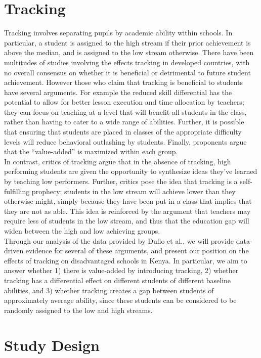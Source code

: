 \documentclass[11pt]{article}
\begin{document}
\section{Tracking}
Tracking involves separating pupils by academic ability within schools. In particular, a student is assigned to the high stream if their prior achievement is above the median, and is assigned to the low stream otherwise. There have been multitudes of studies involving the effects tracking in developed countries, with no overall consensus on whether it is beneficial or detrimental to future student achievement. However those who claim that tracking is beneficial to students have several arguments. For example the reduced skill differential has the potential to allow for better lesson execution and time allocation by teachers; they can focus on teaching at a level that will benefit all students in the class, rather than having to cater to a wide range of abilities. Further, it is possible that ensuring that students are placed in classes of the appropriate difficulty levels will reduce behavioral outlashing by students. Finally, proponents argue that the ``value-added'' is maximized within each group.\\

In contrast, critics of tracking argue that in the absence of tracking, high performing students are given the opportunity to synthesize ideas they've learned by teaching low performers. Further, critics pose the idea that tracking is a self-fulfilling prophecy; students in the low stream will achieve lower than they otherwise might, simply because they have been put in a class that implies that they are not as able. This idea is reinforced by the argument that teachers may require less of students in the low stream, and thus that the education gap will widen between the high and low achieving groups.\\

Through our analysis of the data provided by Duflo et al., we will provide data-driven evidence for several of these arguments, and present our position on the effects of tracking on disadvantaged schools in Kenya. In particular, we aim to answer whether 1) there is value-added by introducing tracking, 2) whether tracking has a differential effect on different students of different baseline abilities, and 3) whether tracking creates a gap between students of approximately average ability, since these students can be considered to be randomly assigned to the low and high streams.
 
 \section{Study Design}
 
\end{document}
